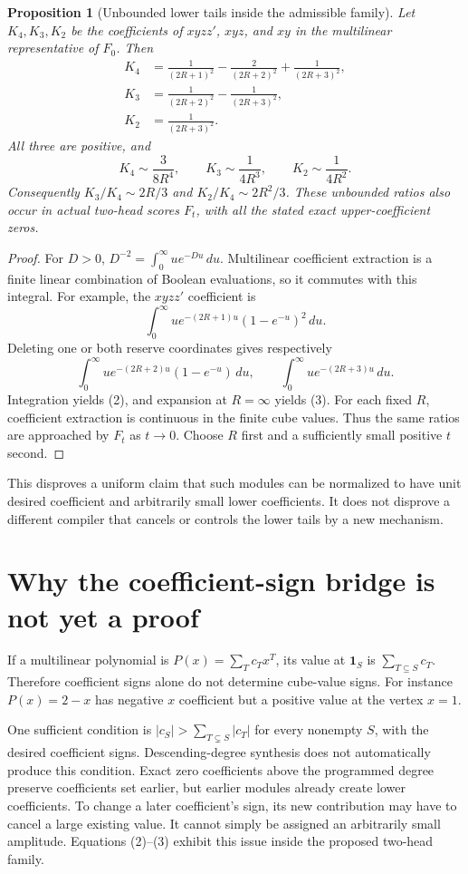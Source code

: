 \documentclass[11pt]{article}
\newtheorem{proposition}{Proposition}
\begin{document}
\begin{proposition}[Unbounded lower tails inside the admissible family]
Let $K_4,K_3,K_2$ be the coefficients of $xyz z'$, $xyz$, and $xy$
in the multilinear representative of $F_0$. Then
\[
\begin{aligned}
 K_4&=\frac1{(2R+1)^2}-\frac2{(2R+2)^2}+\frac1{(2R+3)^2},\\
 K_3&=\frac1{(2R+2)^2}-\frac1{(2R+3)^2},\\
 K_2&=\frac1{(2R+3)^2}.
\end{aligned}
 \tag{2}
\]
All three are positive, and
\[
 K_4\sim\frac3{8R^4},\qquad K_3\sim\frac1{4R^3},\qquad
 K_2\sim\frac1{4R^2}.
 \tag{3}
\]
Consequently $K_3/K_4\sim2R/3$ and $K_2/K_4\sim2R^2/3$.
These unbounded ratios also occur in actual two-head scores $F_t$,
with all the stated exact upper-coefficient zeros.
\end{proposition}
\begin{proof}
For $D>0$, $D^{-2}=\int_0^\infty u e^{-Du}\,du$.
Multilinear coefficient extraction is a finite linear combination of
Boolean evaluations, so it commutes with this integral. For example,
the $xyz z'$ coefficient is
\[
 \int_0^\infty u e^{-(2R+1)u}(1-e^{-u})^2\,du.
\]
Deleting one or both reserve coordinates gives respectively
\[
 \int_0^\infty u e^{-(2R+2)u}(1-e^{-u})\,du,
 \qquad \int_0^\infty u e^{-(2R+3)u}\,du.
\]
Integration yields (2), and expansion at $R=\infty$ yields (3).
For each fixed $R$, coefficient extraction is continuous in the finite
cube values. Thus the same ratios are approached by $F_t$ as $t\to0$.
Choose $R$ first and a sufficiently small positive $t$ second.
\end{proof}

This disproves a uniform claim that such modules can be normalized to
have unit desired coefficient and arbitrarily small lower coefficients.
It does not disprove a different compiler that cancels or controls the
lower tails by a new mechanism.

\section*{Why the coefficient-sign bridge is not yet a proof}
If a multilinear polynomial is
$P(x)=\sum_T c_Tx^T$, its value at $\mathbf1_S$ is
$\sum_{T\subseteq S}c_T$. Therefore coefficient signs alone do not
determine cube-value signs. For instance $P(x)=2-x$ has negative
$x$ coefficient but a positive value at the vertex $x=1$.

One sufficient condition is
$|c_S|>\sum_{T\subsetneq S}|c_T|$ for every nonempty $S$, with the
desired coefficient signs. Descending-degree synthesis does not
automatically produce this condition. Exact zero coefficients above
the programmed degree preserve coefficients set earlier, but earlier
modules already create lower coefficients. To change a later
coefficient's sign, its new contribution may have to cancel a large
existing value. It cannot simply be assigned an arbitrarily small
amplitude. Equations (2)--(3) exhibit this issue inside the proposed
two-head family.
\end{document}
